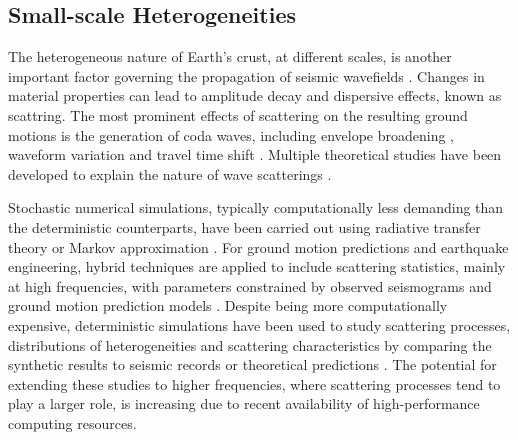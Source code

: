 \subsection{Small-scale Heterogeneities}

The heterogeneous nature of Earth's crust, at different scales, is another important factor governing the propagation of seismic wavefields \citep{levanderSmallscaleHeterogeneityLargescale1992,levanderCrustHeterogeneousOptical1994,beanStatisticalMeasuresCrustal1999,helffrichEarthMantle2001,hedlinSeismicEvidenceSmallscale1997}. Changes in material properties can lead to amplitude decay and dispersive effects, known as scattring. The most prominent effects of scattering on the resulting ground motions is the generation of coda waves, including envelope broadening \citep{satoBroadeningSeismogramEnvelopes1989}, waveform variation and travel time shift \citep{flatteSmallscaleStructureLithosphere1988}. Multiple theoretical studies have been developed to explain the nature of wave scatterings \citep{akiAnalysisSeismicCoda1969, wuMultipleScatteringEnergy1985,akiOriginCodaWaves1975,zengScatteringWaveEnergy1991,zengTheoryScatteredSwave1993,zengSubeventRakeRandom1995}.

Stochastic numerical simulations, typically computationally less demanding than the deterministic counterparts, have been carried out using radiative transfer theory \citep{gusevSimulatedEnvelopesNonisotropically1996,przybillaRadiativeTransferElastic2006} or Markov approximation \citep{saitoEnvelopeBroadeningSpherically2002,sawazakiEnvelopeSynthesisShortperiod2011}. For ground motion predictions and earthquake engineering, hybrid techniques are applied to include scattering statistics, mainly at high frequencies, with parameters constrained by observed seismograms and ground motion prediction models \citep{liuPredictionBroadbandGroundMotion2006,gravesBroadbandGroundMotionSimulation2010, maiHybridBroadbandGroundMotion2010}.
Despite being more computationally expensive, deterministic simulations have been used to study scattering processes, distributions of heterogeneities and scattering characteristics by comparing the synthetic results to seismic records or theoretical predictions \citep{frankelFiniteDifferenceSimulations1986,rothSingleScatteringTheory1993,shapiroSeismicAttenuationScattering1993,thyboSeismicScatteringTop2003}. The potential for extending these studies to higher frequencies, where scattering processes tend to play a larger role, is increasing due to recent availability of high-performance computing resources.

